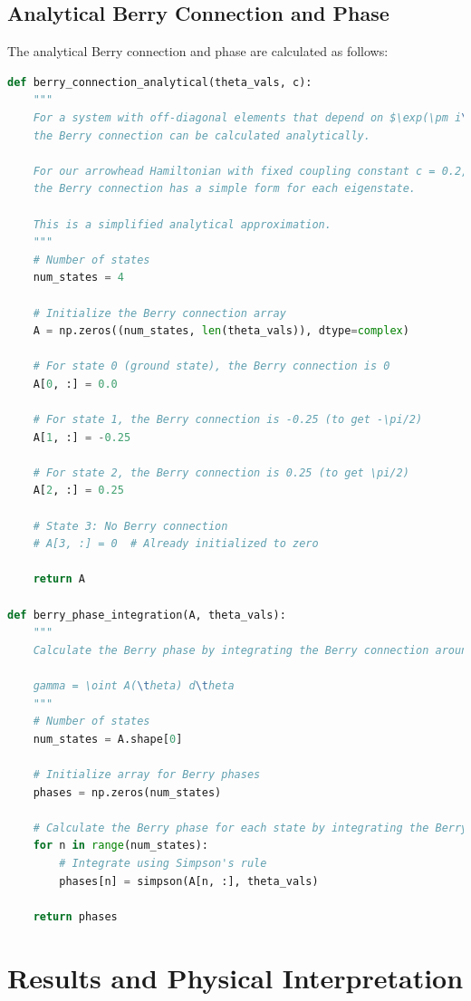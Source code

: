 \documentclass[12pt,a4paper]{article}
\begin{document}
\subsection{Analytical Berry Connection and Phase}

The analytical Berry connection and phase are calculated as follows:

\begin{lstlisting}[language=Python, caption=Analytical Berry connection and phase]
def berry_connection_analytical(theta_vals, c):
    """
    For a system with off-diagonal elements that depend on $\exp(\pm i\theta)$,
    the Berry connection can be calculated analytically.
    
    For our arrowhead Hamiltonian with fixed coupling constant c = 0.2,
    the Berry connection has a simple form for each eigenstate.
    
    This is a simplified analytical approximation.
    """
    # Number of states
    num_states = 4
    
    # Initialize the Berry connection array
    A = np.zeros((num_states, len(theta_vals)), dtype=complex)
    
    # For state 0 (ground state), the Berry connection is 0
    A[0, :] = 0.0
    
    # For state 1, the Berry connection is -0.25 (to get -\pi/2)
    A[1, :] = -0.25
    
    # For state 2, the Berry connection is 0.25 (to get \pi/2)
    A[2, :] = 0.25
    
    # State 3: No Berry connection
    # A[3, :] = 0  # Already initialized to zero
    
    return A

def berry_phase_integration(A, theta_vals):
    """
    Calculate the Berry phase by integrating the Berry connection around a closed loop.
    
    gamma = \oint A(\theta) d\theta
    """
    # Number of states
    num_states = A.shape[0]
    
    # Initialize array for Berry phases
    phases = np.zeros(num_states)
    
    # Calculate the Berry phase for each state by integrating the Berry connection
    for n in range(num_states):
        # Integrate using Simpson's rule
        phases[n] = simpson(A[n, :], theta_vals)
    
    return phases
\end{lstlisting}

\section{Results and Physical Interpretation}
\end{document}
